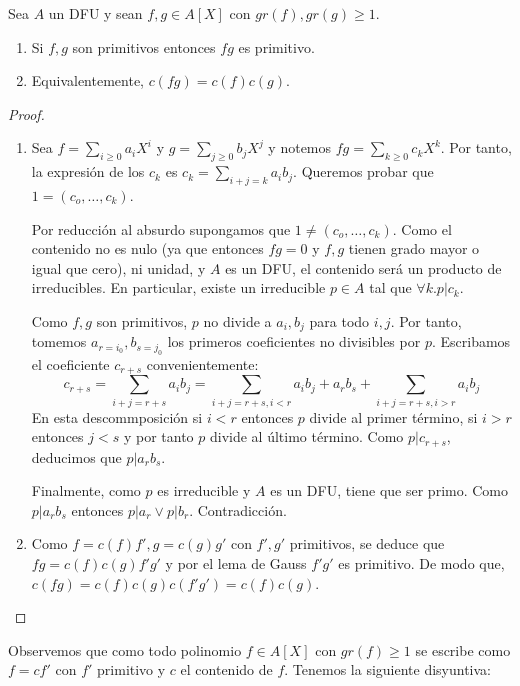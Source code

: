 \begin{lemma}
Sea $A$ un DFU y sean $f,g \in A[X]$ con $gr(f),gr(g) \ge 1$.

\begin{enumerate}
\item Si $f,g$ son primitivos entonces $fg$ es primitivo.
\item Equivalentemente, $c(fg) = c(f)c(g)$. 
\end{enumerate}
\end{lemma}
\begin{proof}
\begin{enumerate}
\item Sea $f = \sum_{i \ge 0} a_iX^i$ y $g = \sum_{j \ge 0} b_jX^j$ y notemos $fg = \sum_{k \ge 0} c_k X^k$. Por tanto, la expresión de los $c_k$ es $c_k = \sum_{i+ j = k} a_ib_j$. Queremos probar que $1 = (c_o, \ldots, c_k)$. 

Por reducción al absurdo supongamos que $1 \neq (c_o, \ldots, c_k)$. Como el contenido no es nulo (ya que entonces $fg = 0$ y $f,g$ tienen grado mayor o igual que cero), ni unidad, y $A$ es un DFU, el contenido será un producto de irreducibles. En particular, existe un irreducible $p \in A$ tal que $\forall k. p|c_k$.

Como $f,g$ son primitivos, $p$ no divide a $a_i,b_j$ para todo $i,j$. Por tanto, tomemos $a_{r = i_0},b_{s = j_0}$ los primeros coeficientes no divisibles por $p$. Escribamos el coeficiente $c_{r+s}$ convenientemente: $$c_{r+s} = \sum_{i+j = r+s} a_ib_j = \sum_{i+j = r+s,i < r} a_ib_j + a_rb_s + \sum_{i+j = r+s, i > r} a_ib_j$$ En esta descommposición si $i < r$ entonces $p$ divide al primer término, si $i > r$ entonces $j < s$ y por tanto $p$ divide al último término. Como $p|c_{r+s}$, deducimos que $p|a_r b_s$. 

Finalmente, como $p$ es irreducible y $A$ es un DFU, tiene que ser primo. Como $p|a_r b_s$ entonces $p|a_r \lor p|b_r$. Contradicción. 

\item Como $f = c(f)f',g = c(g)g'$ con $f',g'$ primitivos, se deduce que $fg = c(f)c(g)f'g'$ y por el lema de Gauss $f'g'$ es primitivo. De modo que, $c(fg) = c(f)c(g)c(f'g') = c(f)c(g)$. 
\end{enumerate}
\end{proof}

Observemos que como todo polinomio $f \in A[X]$ con $gr(f) \ge 1$ se escribe como $f = cf'$ con $f'$ primitivo y $c$ el contenido de $f$. Tenemos la siguiente disyuntiva:

